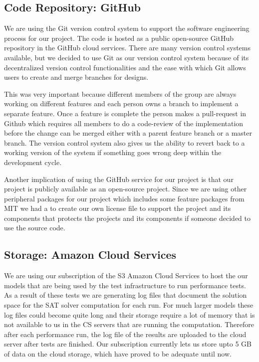 \documentclass[11pt]{article}
\theoremstyle{definition}
\begin{document}
\subsection{Code Repository: GitHub}
We are using the Git version control system \cite{ref:git} to support the software engineering process for our project. The code is hosted as a public open-source GitHub \cite{ref:github} repository in the GitHub cloud services. There are many version control systems available, but we decided to use Git as our version control system because of its decentralized version control functionalities and the ease with which Git allows users to create and merge branches for designs. 

This was very important because different members of the group are always working on different features and each person owns a branch to implement a separate feature. Once a feature is complete the person makes a pull-request in Github which requires all members to do a code-review of the implementation before the change can be merged either with a parent feature branch or a master branch. The version control system also gives us the ability to revert back to a working version of the system if something goes wrong deep within the development cycle.

Another implication of using the GitHub service for our project is that our project is publicly available as an open-source project. Since we are using other peripheral packages for our project which includes some feature packages from MIT we had a to create our own license file to support the project and its components that protects the projects and its components if someone decided to use the source code.

\subsection{Storage: Amazon Cloud Services}
We are using our subscription of the S3 Amazon Cloud Services to host the our models that are being used by the test infrastructure to run performance tests. As a result of these tests we are generating log files that document the solution space for the SAT solver computation for each run. For much larger models these log files could become quite long and their storage require a lot of memory that is not available to us in the CS servers that are running the computation. Therefore after each performance run, the log file of the results are uploaded to the cloud server after tests are finished. Our subscription currently lets us store upto 5 GB of data on the cloud storage, which have proved to be adequate until now.
\end{document}
